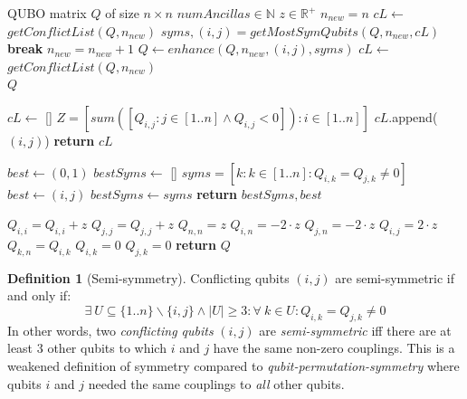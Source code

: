 \documentclass[conference]{IEEEtran}
\theoremstyle{plain}
\theoremstyle{definition}
\newtheorem{definition}[theorem]{Definition}
\theoremstyle{remark}
\begin{document}
\begin{algorithm}[H]
   \caption{Factoring our Semi-Symmetries}
   \label{alg:example}
\begin{algorithmic}
    QUBO matrix $Q$ of size $n \times n$
   \State \:\:\:\:\:\:\:\:\:\:\:\:\: $numAncillas \in \mathbb{N}$
   \State \:\:\:\:\:\:\:\:\:\:\:\:\: $z \in \mathbb{R^+}$
   \State $n_{new} = n$ 
   \State $cL \gets$ \textit{$getConflictList(Q,n_{new})$}
   \State $syms, (i,j) = getMostSymQubits(Q, n_{new}, cL)$
   \State \textbf{break}
   \EndIf
   \State $n_{new} = n_{new} + 1$
   \State $Q \gets enhance(Q, n_{new}, (i,j), syms)$
   \State $cL \gets$ \textit{$getConflictList(Q,n_{new})$}
   \EndWhile \\
   \Return $Q$
   
   \State 
   \State $cL \gets$ []
   \State $Z = [sum([Q_{i,j} : j \in [1..n] \land Q_{i,j} < 0]) : i \in [1..n]]$
   \State $cL$.append($(i,j)$)
   \EndIf
   \EndFor
   \State \textbf{return} $cL$
   \EndFunction
   
   \State 
   \State $best \gets (0,1)$
   \State $bestSyms \gets$ []
   \State $syms = [k : k \in [1..n] : Q_{i,k} = Q_{j,k} \neq 0]$
   \State $best \gets (i,j)$
   \State $bestSyms \gets syms$
   \EndIf
   \EndFor
   \State \textbf{return} $bestSyms, best$
   \EndFunction
   
   \State 
   \State $Q_{i,i} = Q_{i,i} + z$
   \State $Q_{j,j} = Q_{j,j} + z$
   \State $Q_{n,n} = z$
   \State $Q_{i,n} = -2 \cdot z$
   \State $Q_{j,n} = -2 \cdot z$
   \State $Q_{i,j} = 2 \cdot z$
   \State $Q_{k,n} = Q_{i,k}$
   \State $Q_{i,k} = 0$
   \State $Q_{j,k} = 0$
   \EndFor
   \State \textbf{return} $Q$
   \EndFunction
   
\end{algorithmic}
\end{algorithm}


\begin{definition}[Semi-symmetry]
Conflicting qubits $(i,j)$ are semi-symmetric if and only if:
\[
\exists \: U \subseteq \{1..n\} \backslash \{i,j\} \land |U| \geq 3 : \forall \: k \in U : Q_{i,k} = Q_{j,k} \neq 0
\]
In other words, two \textit{conflicting qubits} $(i,j)$ are \textit{semi-symmetric} iff there are at least $3$ other qubits to which $i$ and $j$ have the same non-zero couplings. This is a weakened definition of symmetry compared to \textit{qubit-permutation-symmetry} where qubits $i$ and $j$ needed the same couplings to \textit{all} other qubits.
\end{definition}
\end{document}
